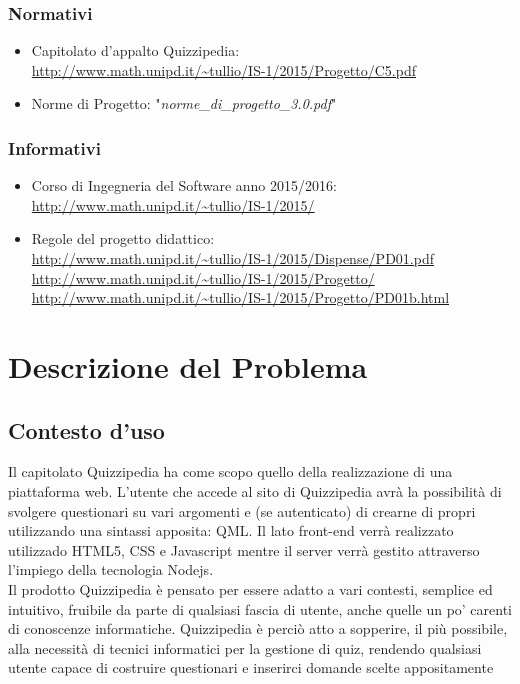 \documentclass[a4paper,11pt]{article}
\begin{document}
		\subsubsection{Normativi}
		\begin{itemize}
			\item Capitolato d'appalto Quizzipedia:\\
			\url{http://www.math.unipd.it/~tullio/IS-1/2015/Progetto/C5.pdf}
			\item Norme di Progetto: "\textit{norme\_di\_progetto\_3.0.pdf}"
		\end{itemize}
		\subsubsection{Informativi}
		\begin{itemize}
			\item Corso di Ingegneria del Software anno 2015/2016:\\
			\url{http://www.math.unipd.it/~tullio/IS-1/2015/}
			\item Regole del progetto didattico:\\
			\url{http://www.math.unipd.it/~tullio/IS-1/2015/Dispense/PD01.pdf}
			\url{http://www.math.unipd.it/~tullio/IS-1/2015/Progetto/}\\
			\url{http://www.math.unipd.it/~tullio/IS-1/2015/Progetto/PD01b.html}
		\end{itemize}
	\pagebreak

	\newpage	
	\section{Descrizione del Problema}
	\subsection{Contesto d'uso}
		Il capitolato Quizzipedia ha come scopo quello della realizzazione di una piattaforma web. L'utente che accede al sito di Quizzipedia avrà la possibilità di svolgere questionari su vari argomenti e (se autenticato) di crearne di propri utilizzando una sintassi apposita: QML. Il lato front-end verrà realizzato utilizzado HTML5, CSS e Javascript mentre il server verrà gestito attraverso l'impiego della tecnologia Nodejs.\\
		Il prodotto Quizzipedia è pensato per essere adatto a vari contesti, semplice ed intuitivo, fruibile da parte di qualsiasi fascia di utente, anche quelle un po' carenti di conoscenze informatiche. Quizzipedia è perciò atto a sopperire, il più possibile, alla necessità di tecnici informatici per la gestione di quiz, rendendo qualsiasi utente capace di costruire questionari e inserirci domande scelte appositamente
\end{document}
